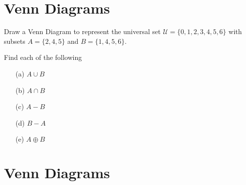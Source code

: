 \newpage
\section*{Venn Diagrams}
Draw a Venn Diagram to represent the universal set
$\mathcal{U} = \{0,1,2,3,4,5,6\}$ with subsets
$A = \{2,4,5\}$ and 
$B = \{1,4,5,6\}$.

\noindent Find each of the following
\begin{itemize}
\item[(a)] $A \cup B $
\item[(b)] $A \cap B $
\item[(c)] $A-B$
\item[(d)] $B-A$
\item[(e)] $A \oplus B$
\end{itemize}
\newpage
\section*{Venn Diagrams}
